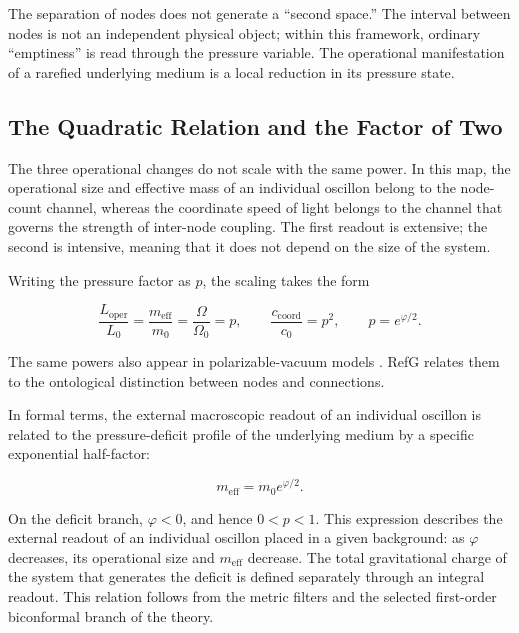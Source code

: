 \documentclass[11pt,a4paper]{article}
\begin{document}
The separation of nodes does not generate a ``second space.'' The interval between nodes is not an independent physical object; within this framework, ordinary ``emptiness'' is read through the pressure variable. The operational manifestation of a rarefied underlying medium is a local reduction in its pressure state.

\subsection{The Quadratic Relation and the Factor of Two}

The three operational changes do not scale with the same power. In this map, the operational size and effective mass of an individual oscillon belong to the node-count channel, whereas the coordinate speed of light belongs to the channel that governs the strength of inter-node coupling. The first readout is extensive; the second is intensive, meaning that it does not depend on the size of the system.

Writing the pressure factor as $p$, the scaling takes the form

\begin{equation}
\frac{L_{\mathrm{oper}}}{L_0}
=\frac{m_{\mathrm{eff}}}{m_0}
=\frac{\Omega}{\Omega_0}
=p,
\qquad
\frac{c_{\mathrm{coord}}}{c_0}=p^2,
\qquad
p=e^{\varphi/2}.
\label{eq:operational-scaling}
\end{equation}

The same powers also appear in polarizable-vacuum models \citep{dicke1957,puthoff2002}. RefG relates them to the ontological distinction between nodes and connections.

In formal terms, the external macroscopic readout of an individual oscillon is related to the pressure-deficit profile of the underlying medium by a specific exponential half-factor:

\begin{equation}
m_{\mathrm{eff}}=m_0 e^{\varphi/2}.
\label{eq:effective-mass}
\end{equation}

On the deficit branch, $\varphi<0$, and hence $0<p<1$. This expression describes the external readout of an individual oscillon placed in a given background: as $\varphi$ decreases, its operational size and $m_{\mathrm{eff}}$ decrease. The total gravitational charge of the system that generates the deficit is defined separately through an integral readout. This relation follows from the metric filters and the selected first-order biconformal branch of the theory.
\end{document}
